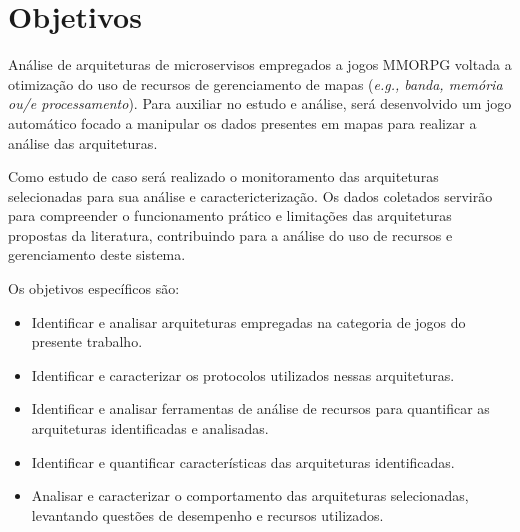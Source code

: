 \section{Objetivos}
\label{obj}

Análise de arquiteturas de microservisos empregados a jogos MMORPG voltada a otimização do uso de recursos de gerenciamento de mapas (\textit{e.g., banda, memória ou/e processamento}). Para auxiliar no estudo e análise, será desenvolvido um jogo automático focado a manipular os dados presentes em  mapas para realizar a análise das arquiteturas.

Como estudo de caso será realizado o monitoramento das arquiteturas selecionadas para sua análise e caractericterização. Os dados coletados servirão para compreender o funcionamento prático e limitações das arquiteturas propostas da literatura, contribuindo para a análise do uso de recursos e gerenciamento deste sistema.

Os objetivos específicos são:
\begin{itemize}
    \item Identificar e analisar arquiteturas empregadas na categoria de jogos do presente trabalho.
    \item Identificar e caracterizar os protocolos utilizados nessas arquiteturas.
    \item Identificar e analisar ferramentas de análise de recursos para quantificar as arquiteturas identificadas e analisadas.
    \item Identificar e quantificar características das arquiteturas identificadas.
    \item Analisar e caracterizar o comportamento das arquiteturas selecionadas, levantando questões de desempenho e recursos utilizados.
\end{itemize}
